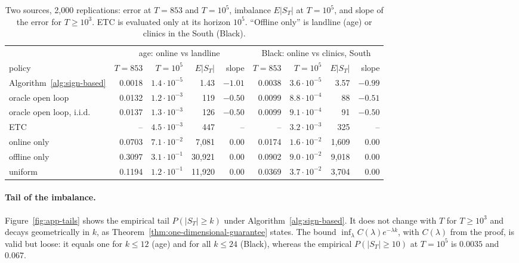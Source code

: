 \documentclass[twoside]{article}
\begin{document}
\begin{table}[!ht]
\caption{Two sources, 2{,}000 replications: error at \(T=853\) and
\(T=10^5\), imbalance \(E|S_T|\) at \(T=10^5\), and slope of the error for
\(T\ge10^3\). ETC is evaluated only at its horizon \(10^5\). ``Offline
only'' is landline (age) or clinics in the South (Black).}
\label{tab:two}
\centering\small
\begin{tabular}{l|rrrr|rrrr}
\hline
 & \multicolumn{4}{c|}{age: online vs landline} & \multicolumn{4}{c}{Black: online vs clinics, South}\\
policy & \(T=853\) & \(T=10^5\) & \(E|S_T|\) & slope & \(T=853\) & \(T=10^5\) & \(E|S_T|\) & slope\\
\hline
Algorithm~\ref{alg:sign-based} & 0.0018 & \(1.4\cdot10^{-5}\) & 1.43 & \(-1.01\) & 0.0038 & \(3.6\cdot10^{-5}\) & 3.57 & \(-0.99\)\\
oracle open loop & 0.0132 & \(1.2\cdot10^{-3}\) & 119 & \(-0.50\) & 0.0099 & \(8.8\cdot10^{-4}\) & 88 & \(-0.51\)\\
oracle open loop, i.i.d. & 0.0137 & \(1.3\cdot10^{-3}\) & 126 & \(-0.50\) & 0.0099 & \(9.1\cdot10^{-4}\) & 91 & \(-0.50\)\\
ETC & -- & \(4.5\cdot10^{-3}\) & 447 & -- & -- & \(3.2\cdot10^{-3}\) & 325 & --\\
online only & 0.0703 & \(7.1\cdot10^{-2}\) & 7{,}081 & \(0.00\) & 0.0174 & \(1.6\cdot10^{-2}\) & 1{,}609 & \(0.00\)\\
offline only & 0.3097 & \(3.1\cdot10^{-1}\) & 30{,}921 & \(0.00\) & 0.0902 & \(9.0\cdot10^{-2}\) & 9{,}018 & \(0.00\)\\
uniform & 0.1194 & \(1.2\cdot10^{-1}\) & 11{,}920 & \(0.00\) & 0.0369 & \(3.7\cdot10^{-2}\) & 3{,}704 & \(0.00\)\\
\hline
\end{tabular}
\end{table}

\paragraph{Tail of the imbalance.} Figure~\ref{fig:app-tails} shows the
empirical tail \(P(|S_T|\ge k)\) under Algorithm~\ref{alg:sign-based}. It
does not change with \(T\) for \(T\ge10^3\) and decays geometrically in
\(k\), as Theorem~\ref{thm:one-dimensional-guarantee} states. The bound
\(\inf_\lambda C(\lambda)e^{-\lambda k}\), with \(C(\lambda)\) from the
proof, is valid but loose: it equals one for \(k\le12\) (age) and for all
\(k\le24\) (Black), whereas the empirical \(P(|S_T|\ge10)\) at \(T=10^5\) is
\(0.0035\) and \(0.067\).
\end{document}
